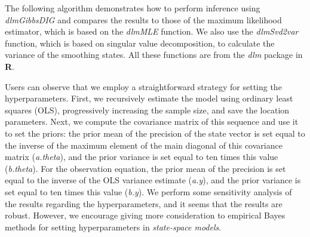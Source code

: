 The following algorithm demonstrates how to perform inference using \textit{dlmGibbsDIG} and compares the results to those of the maximum likelihood estimator, which is based on the \textit{dlmMLE} function. We also use the \textit{dlmSvd2var} function, which is based on singular value decomposition, to calculate the variance of the smoothing states. All these functions are from the \textit{dlm} package in \textbf{R}.

Users can observe that we employ a straightforward strategy for setting the hyperparameters. First, we recursively estimate the model using ordinary least squares (OLS), progressively increasing the sample size, and save the location parameters. Next, we compute the covariance matrix of this sequence and use it to set the priors: the prior mean of the precision of the state vector is set equal to the inverse of the maximum element of the main diagonal of this covariance matrix (\textit{a.theta}), and the prior variance is set equal to ten times this value (\textit{b.theta}). For the observation equation, the prior mean of the precision is set equal to the inverse of the OLS variance estimate (\textit{a.y}), and the prior variance is set equal to ten times this value (\textit{b.y}). We perform some sensitivity analysis of the results regarding the hyperparameters, and it seems that the results are robust. However, we encourage giving more consideration to empirical Bayes methods for setting hyperparameters in \textit{state-space models}.

